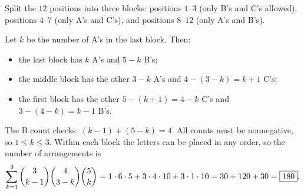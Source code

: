 Split the $12$ positions into three blocks: positions $1$--$3$ (only B's and C's allowed), positions $4$--$7$ (only A's and C's), and positions $8$--$12$ (only A's and B's).

Let $k$ be the number of A's in the last block. Then:
\begin{itemize}
\item the last block has $k$ A's and $5-k$ B's;
\item the middle block has the other $3-k$ A's and $4-(3-k)=k+1$ C's;
\item the first block has the other $5-(k+1)=4-k$ C's and $3-(4-k)=k-1$ B's.
\end{itemize}
The B count checks: $(k-1)+(5-k)=4$. All counts must be nonnegative, so $1\le k\le3$. Within each block the letters can be placed in any order, so the number of arrangements is
\[\sum_{k=1}^{3}\dbinom{3}{k-1}\dbinom{4}{3-k}\dbinom{5}{k}=1\cdot6\cdot5+3\cdot4\cdot10+3\cdot1\cdot10=30+120+30=\boxed{180}.\]
